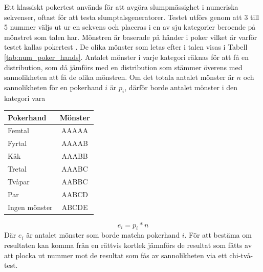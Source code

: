 \documentclass[swedish,a4paper]{article}
\begin{document}

\noindent
\begin{minipage}[t]{0.6\textwidth}
Ett klassiskt pokertest används för att avgöra slump\-mässighet i numeriska 
sekvenser, oftast för att testa slumptalsgeneratorer. Testet utförs genom
att 3 till 5 nummer väljs ut ur en sekvens och placeras i en av sju
kategorier beroende på mönstret som talen har.  Mönstren är baserade på händer i poker vilket är varför testet kallas pokertest \parencite{Abdel2014}. 
De olika mönster som letas efter i talen visas i Tabell \ref{tab:num_poker_hands}.
\indent
 Antalet mönster i varje kategori räknas för att få en distribution, som
 då jämförs med en distribution som stämmer överens med sannolikheten
 att få de olika mönstren. Om det totala antalet mönster är $n$ och
 sannolikheten för en pokerhand $i$ är $p_i$, därför borde antalet mönster i
 den kategori vara 
\end{minipage}%
\hfill
\begin{minipage}[t]{0.40\textwidth}
	\centering
	\captionsetup{width=0.5\textwidth}
    \label{tab:num_poker_hands}
	\begin{tabular}{|l|c|}
	\hline 
	Pokerhand & Mönster \\ \hline  
	Femtal & AAAAA \\ \hline
	Fyrtal & AAAAB \\ \hline
	Kåk & AAABB \\ \hline
	Tretal & AAABC \\ \hline
	Tvåpar & AABBC \\ \hline
	Par & AABCD \\ \hline
    	Ingen mönster & ABCDE \\ \hline
	
\end{tabular}
%
\end{minipage}
$$e_i = p_i * n$$
 Där $e_i$ är antalet mönster som
 borde matcha pokerhand $i$. För att bestäma om resultaten kan komma
 från en rättvis kortlek jämnförs de resultat som fåtts av att plocka
 ut nummer mot de resultat som fås av sannolikheten via ett chi-två-test.
\end{document}
